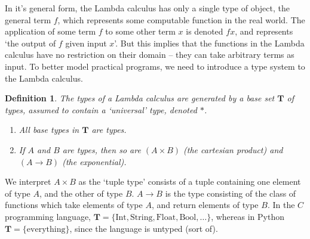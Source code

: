 \documentclass{article}
\theoremstyle{plain}
\newtheorem{definition}{Definition}
\begin{document}
In it's general form, the Lambda calculus has only a single type of object, the general term $f$, which represents some computable function in the real world. The application of some term $f$ to some other term $x$ is denoted $fx$, and represents `the output of $f$ given input $x$'. But this implies that the functions in the Lambda calculus have no restriction on their domain -- they can take arbitrary terms as input. To better model practical programs, we need to introduce a type system to the Lambda calculus.

\begin{definition}
    The types of a Lambda calculus are generated by a base set $\mathbf{T}$ of types, assumed to contain a `universal' type, denoted $*$.
    \begin{enumerate}
        \item All base types in $\mathbf{T}$ are types.
        \item If $A$ and $B$ are types, then so are $(A \times B)$ (the cartesian product) and $(A \rightarrow B)$ (the exponential).
    \end{enumerate}
\end{definition}

We interpret $A \times B$ as the `tuple type' consists of a tuple containing one element of type $A$, and the other of type $B$. $A \rightarrow B$ is the type consisting of the class of functions which take elements of type $A$, and return elements of type $B$. In the $C$ programming language, $\mathbf{T} = \{ \text{Int}, \text{String}, \text{Float}, \text{Bool}, \dots \}$, whereas in Python $\mathbf{T} = \{ \text{everything} \}$, since the language is untyped (sort of).
\end{document}
